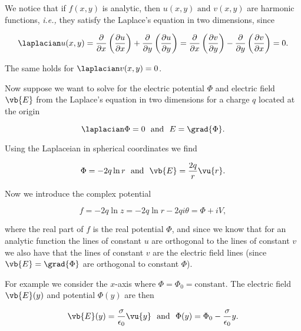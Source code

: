 \documentclass[english,a4paper,12pt]{report}
\begin{document}
We notice that if \(f(x,y)\) is analytic, then \(u(x,y) \text { and } v(x,y)\) are harmonic functions, \textit{i.e.,} they satisfy the Laplace's equation in two dimensions, since

\begin{equation}
    \laplacian u(x,y) = \frac{\partial }{\partial x} \left( \frac{\partial u}{\partial x}  \right) + \frac{\partial }{\partial y} \left( \frac{\partial u}{\partial y}  \right) = \frac{\partial }{\partial x} \left( \frac{\partial v}{\partial y}  \right) - \frac{\partial }{\partial y} \left( \frac{\partial v}{\partial x}  \right) = 0.
\end{equation}

The same holds for \(\laplacian v(x,y) = 0\). 

Now suppose we want to solve for the electric potential \(\Phi \) and electric field \(\vb{E} \) from the Laplace's equation in two dimensions for a charge \(q\) located at the origin

\begin{equation}
    \laplacian \Phi = 0 ~\text { and }~ E = \grad{\Phi }. 
\end{equation}

Using the Laplaceian in spherical coordinates we find 

\begin{equation}
    \Phi  = -2q\ln r ~\text { and }~ \vb{E} = \frac{2q}{r}\vu{r} . 
\end{equation}

Now we introduce the complex potential 

\begin{equation}
    f = -2q \ln z = -2q \ln r - 2q i \theta = \Phi + iV,
\end{equation}

where the real part of \(f\) is the real potential \(\Phi \), and since we know that for an analytic function the lines of constant \(u\) are orthogonal to the lines of constant \(v\) we also have that the lines of constant \(v\) are the electric field lines (since \(\vb{E} = \grad{\Phi } \) are orthogonal to constant \(\Phi \)).

For example we consider the \(x\)-axis where \(\Phi = \Phi _{0} = \text{constant}  \). The electric field \(\vb{E} (y) \) and potential \(\Phi (y)\) are then   

\begin{equation}
    \vb{E}(y) = \frac{\sigma }{\epsilon_0 } \vu{y}  ~\text { and }~ \Phi (y) = \Phi _{0} - \frac{\sigma }{\epsilon_0 }y.  
\end{equation}
\end{document}
